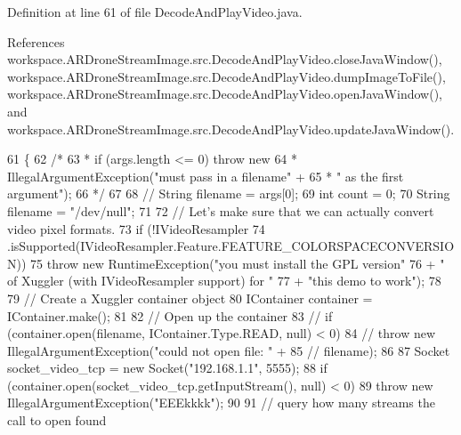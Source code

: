 Definition at line 61 of file Decode\+And\+Play\+Video.\+java.



References workspace.\+A\+R\+Drone\+Stream\+Image.\+src.\+Decode\+And\+Play\+Video.\+close\+Java\+Window(), workspace.\+A\+R\+Drone\+Stream\+Image.\+src.\+Decode\+And\+Play\+Video.\+dump\+Image\+To\+File(), workspace.\+A\+R\+Drone\+Stream\+Image.\+src.\+Decode\+And\+Play\+Video.\+open\+Java\+Window(), and workspace.\+A\+R\+Drone\+Stream\+Image.\+src.\+Decode\+And\+Play\+Video.\+update\+Java\+Window().


\begin{DoxyCode}
61                                                               \{
62         \textcolor{comment}{/*}
63 \textcolor{comment}{         * if (args.length <= 0) throw new
}
64 \textcolor{comment}{         * IllegalArgumentException("must pass in a filename" +
}
65 \textcolor{comment}{         * " as the first argument");
}
66 \textcolor{comment}{         */}
67 
68         \textcolor{comment}{// String filename = args[0];}
69         \textcolor{keywordtype}{int} count = 0;
70         String filename = \textcolor{stringliteral}{"/dev/null"};
71 
72         \textcolor{comment}{// Let's make sure that we can actually convert video pixel formats.}
73         \textcolor{keywordflow}{if} (!IVideoResampler
74                 .isSupported(IVideoResampler.Feature.FEATURE\_COLORSPACECONVERSION))
75             \textcolor{keywordflow}{throw} \textcolor{keyword}{new} RuntimeException(\textcolor{stringliteral}{"you must install the GPL version"}
76                     + \textcolor{stringliteral}{" of Xuggler (with IVideoResampler support) for "}
77                     + \textcolor{stringliteral}{"this demo to work"});
78 
79         \textcolor{comment}{// Create a Xuggler container object}
80         IContainer container = IContainer.make();
81 
82         \textcolor{comment}{// Open up the container}
83         \textcolor{comment}{// if (container.open(filename, IContainer.Type.READ, null) < 0)}
84         \textcolor{comment}{// throw new IllegalArgumentException("could not open file: " +}
85         \textcolor{comment}{// filename);}
86 
87         Socket socket\_video\_tcp = \textcolor{keyword}{new} Socket(\textcolor{stringliteral}{"192.168.1.1"}, 5555);
88         \textcolor{keywordflow}{if} (container.open(socket\_video\_tcp.getInputStream(), null) < 0)
89             \textcolor{keywordflow}{throw} \textcolor{keyword}{new} IllegalArgumentException(\textcolor{stringliteral}{"EEEkkkk"});
90 
91         \textcolor{comment}{// query how many streams the call to open found}

\end{DoxyCode}
